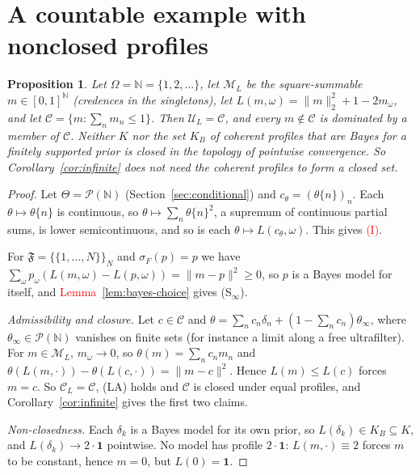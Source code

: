 \documentclass[11pt]{article}
\newtheorem{proposition}[theorem]{Proposition}
\theoremstyle{definition}
\theoremstyle{remark}
\newcommand{\M}{\mathcal M}
\newcommand{\C}{\mathcal C}
\newcommand{\F}{\mathfrak F}
\newcommand{\U}{\mathcal U}
\newcommand{\PP}{\mathcal P}
\newcommand{\one}{\mathbf 1}
\begin{document}
\section{A countable example with nonclosed profiles}\label{sec:countable}
\begin{proposition}\label{prop:countable}
Let $\Omega=\mathbb N=\{1,2,\dots\}$, let $\M_L$ be the square-summable $m\in[0,1]^{\mathbb N}$ (credences in the singletons), let $L(m,\omega)=\|m\|_2^2+1-2m_\omega$, and let $\C=\{m:\sum_nm_n\le1\}$. Then $\U_L=\C$, and every $m\notin\C$ is dominated by a member of $\C$. Neither $K$ nor the set $K_B$ of coherent profiles that are Bayes for a finitely supported prior is closed in the topology of pointwise convergence. So Corollary~\ref{cor:infinite} does not need the coherent profiles to form a closed set.
\end{proposition}
\begin{proof}
Let $\Theta=\PP(\mathbb N)$ (Section~\ref{sec:conditional}) and $c_\theta=(\theta\{n\})_n$. Each $\theta\mapsto\theta\{n\}$ is continuous, so $\theta\mapsto\sum_n\theta\{n\}^2$, a supremum of continuous partial sums, is lower semicontinuous, and so is each $\theta\mapsto L(c_\theta,\omega)$. This gives \textcolor{red}{(I)}.

For $\F=\{\{1,\dots,N\}\}_N$ and $\sigma_F(p)=p$ we have $\sum_\omega p_\omega(L(m,\omega)-L(p,\omega))=\|m-p\|^2\ge0$, so $p$ is a Bayes model for itself, and \textcolor{red}{Lemma~\ref{lem:bayes-choice}} gives (S$_\infty$).

\emph{Admissibility and closure.} Let $c\in\C$ and $\theta=\sum_nc_n\delta_n+(1-\sum_nc_n)\theta_\infty$, where $\theta_\infty\in\PP(\mathbb N)$ vanishes on finite sets (for instance a limit along a free ultrafilter). For $m\in\M_L$, $m_\omega\to0$, so $\theta(m)=\sum_nc_nm_n$ and $\theta(L(m,\cdot))-\theta(L(c,\cdot))=\|m-c\|^2$. Hence $L(m)\le L(c)$ forces $m=c$. So $\C_L=\C$, (LA) holds and $\C$ is closed under equal profiles, and Corollary~\ref{cor:infinite} gives the first two claims.

\emph{Non-closedness.} Each $\delta_k$ is a Bayes model for its own prior, so $L(\delta_k)\in K_B\subseteq K$, and $L(\delta_k)\to2\cdot\one$ pointwise. No model has profile $2\cdot\one$: $L(m,\cdot)\equiv2$ forces $m$ to be constant, hence $m=0$, but $L(0)=\one$.
\end{proof}
\end{document}
